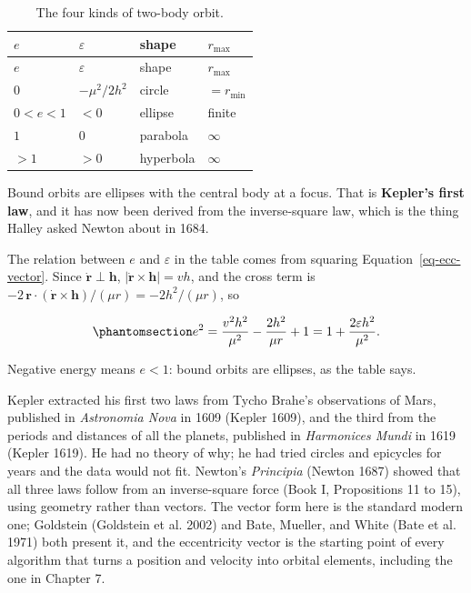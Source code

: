 \documentclass[
  10.5pt,
  letterpaper,
]{scrbook}
\theoremstyle{definition}
\theoremstyle{plain}
\theoremstyle{remark}
\begin{document}
\begin{longtable}[]{@{}llll@{}}
\caption{The four kinds of two-body
orbit.}\label{tbl-conics}\tabularnewline
\toprule\noalign{}
\(e\) & \(\varepsilon\) & shape & \(r_{\max}\) \\
\midrule\noalign{}
\endfirsthead
\toprule\noalign{}
\(e\) & \(\varepsilon\) & shape & \(r_{\max}\) \\
\midrule\noalign{}
\endhead
\bottomrule\noalign{}
\endlastfoot
\(0\) & \(-\mu^2/2h^2\) & circle & \(= r_{\min}\) \\
\(0 < e < 1\) & \(< 0\) & ellipse & finite \\
\(1\) & \(0\) & parabola & \(\infty\) \\
\(> 1\) & \(> 0\) & hyperbola & \(\infty\) \\
\end{longtable}

Bound orbits are ellipses with the central body at a focus. That is
\textbf{Kepler's first law}, and it has now been derived from the
inverse-square law, which is the thing Halley asked Newton about in
1684.

The relation between \(e\) and \(\varepsilon\) in the table comes from
squaring Equation~\ref{eq-ecc-vector}. Since
\(\dot{\mathbf{r}} \perp \mathbf{h}\),
\(|\dot{\mathbf{r}}\times\mathbf{h}| = vh\), and the cross term is
\(-2\,\mathbf{r}\cdot(\dot{\mathbf{r}}\times\mathbf{h})/(\mu r) = -2h^2/(\mu r)\),
so

\begin{equation}\protect\phantomsection\label{eq-e-energy}{
e^2 = \frac{v^2 h^2}{\mu^2} - \frac{2h^2}{\mu r} + 1 = 1 + \frac{2\varepsilon h^2}{\mu^2}.
}\end{equation}

Negative energy means \(e<1\): bound orbits are ellipses, as the table
says.

\begin{tcolorbox}[enhanced jigsaw, arc=.35mm, bottomrule=.15mm, bottomtitle=1mm, breakable, colback=white, colbacktitle=quarto-callout-note-color!10!white, colframe=quarto-callout-note-color-frame, coltitle=black, left=2mm, leftrule=.75mm, opacityback=0, opacitybacktitle=0.6, rightrule=.15mm, title={Where it comes from}, titlerule=0mm, toprule=.15mm, toptitle=1mm]

Kepler extracted his first two laws from Tycho Brahe's observations of
Mars, published in \emph{Astronomia Nova} in 1609 (Kepler 1609), and the
third from the periods and distances of all the planets, published in
\emph{Harmonices Mundi} in 1619 (Kepler 1619). He had no theory of why;
he had tried circles and epicycles for years and the data would not fit.
Newton's \emph{Principia} (Newton 1687) showed that all three laws
follow from an inverse-square force (Book I, Propositions 11 to 15),
using geometry rather than vectors. The vector form here is the standard
modern one; Goldstein (Goldstein et al. 2002) and Bate, Mueller, and
White (Bate et al. 1971) both present it, and the eccentricity vector is
the starting point of every algorithm that turns a position and velocity
into orbital elements, including the one in Chapter 7.

\end{tcolorbox}
\end{document}
